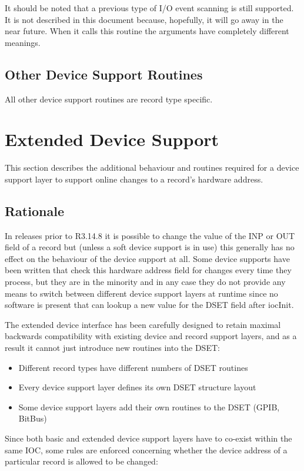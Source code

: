 It should be noted that a previous type of I/O event scanning is still supported. It is not described in this document 
because, hopefully, it will go away in the near future. When it calls this routine the arguments have completely different 
meanings.

\subsection{Other Device Support Routines}

All other device support routines are record type specific.

\section{Extended Device Support}

This section describes the additional behaviour and routines required for a device support layer to support online changes 
to a record's hardware address.

\subsection{Rationale}

In releases prior to R3.14.8 it is possible to change the value of the INP or OUT field of a record but (unless a soft device 
support is in use) this generally has no effect on the behaviour of the device support at all. Some device supports have 
been written that check this hardware address field for changes every time they process, but they are in the minority and in 
any case they do not provide any means to switch between different device support layers at runtime since no software is 
present that can lookup a new value for the DSET field after iocInit.

The extended device interface has been carefully designed to retain maximal backwards compatibility with existing 
device and record support layers, and as a result it cannot just introduce new routines into the DSET:

\begin{itemize}\item Different record types have different numbers of DSET routines

\item Every device support layer defines its own DSET structure layout

\item Some device support layers add their own routines to the DSET (GPIB, BitBus)

\end{itemize}Since both basic and extended device support layers have to co-exist within the same IOC, some rules are enforced 
concerning whether the device address of a particular record is allowed to be changed:

